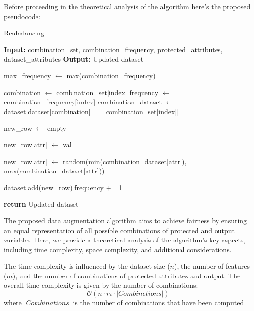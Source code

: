 Before proceeding in the theoretical analysis of the algorithm here's the proposed pseudocode:

\begin{algorithm}[H]
    \caption{Reabalancing}
    \begin{algorithmic}[1]
        \State \textbf{Input:} combination\_set, combination\_frequency, protected\_attributes, dataset\_attributes
        \State \textbf{Output:} Updated dataset

        \State max\_frequency $\gets$ max(combination\_frequency)

            \State combination $\gets$ combination\_set[index]
            \State frequency $\gets$ combination\_frequency[index]
            \State combination\_dataset $\gets$ dataset[dataset[combination] == combination\_set[index]]

                \State new\_row $\gets$ empty

                    \State new\_row[attr] $\gets$ val
                \EndFor

                    \State new\_row[attr] $\gets$ random(min(combination\_dataset[attr]), max(combination\_dataset[attr]))
                \EndFor

                \State dataset.add(new\_row)
                \State frequency $+$= 1
            \EndWhile
        \EndFor

        \State \textbf{return} Updated dataset
    \end{algorithmic}
\end{algorithm}

The proposed data augmentation algorithm aims to achieve fairness by ensuring an equal representation of all possible combinations of protected and output variables. Here, we provide a theoretical analysis of the algorithm's key aspects, including time complexity, space complexity, and additional considerations.

The time complexity is influenced by the dataset size ($n$), the number of features ($m$), and the number of combinations of protected attributes and output. The overall time complexity is given by the number of combinations:
\[
\mathcal{O}(n \cdot m \cdot |Combinations|)
\]
where $|Combinations|$ is the number of combinations that have been computed

